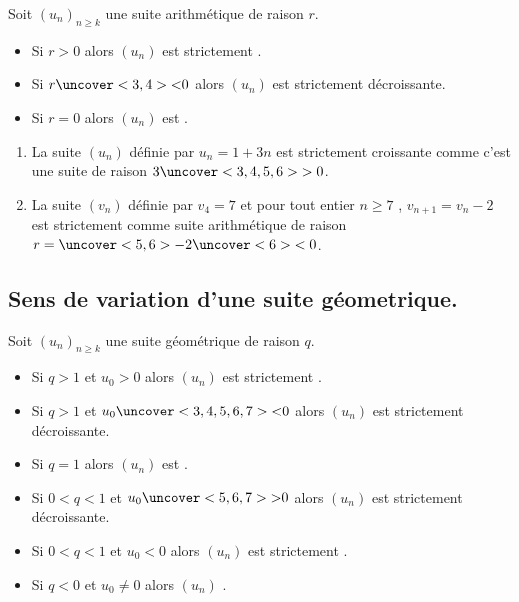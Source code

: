 \documentclass{beamer}
\begin{document}
 \begin{frame}
 \begin{theorem}
  Soit $(u_n)_{n \geq k}$ une suite arithmétique de raison $r$.
  \begin{itemize}
   \item Si $r >0$ alors $(u_n)$ est strictement .
   \item Si $r \uncover<3,4>{<} 0$ alors $(u_n)$ est strictement décroissante.
   \item Si $r=0$ alors $(u_n)$ est .
  \end{itemize}
 \end{theorem}
 \end{frame}
 
 \begin{frame}
 \begin{example}
    
    \begin{enumerate}
     \item La suite $(u_n)$ définie par $u_n=1+3n$ est strictement croissante comme 
     c'est une suite  de raison $3\uncover<3,4,5,6>{>0}$.
     \item La suite $(v_n)$ définie par $v_4=7$ et pour tout entier $n \geq 7$
     , $v_{n+1}=v_n -2$ est strictement  comme suite arithmétique
     de raison $r=\uncover<5,6>{-2}\uncover<6>{<0}$.
    \end{enumerate}
 \end{example}
 \end{frame}
 
    \subsection{Sens de variation d'une suite géometrique.}

 \begin{frame}
 \begin{theorem}
  Soit $(u_n)_{n \geq k}$ une suite géométrique de raison $q$.
  \begin{itemize}
   \item Si $q > 1$ et $u_0>0$ alors $(u_n)$ est strictement .
   \item Si $q > 1$ et $u_0\uncover<3,4,5,6,7>{<}0$ alors $(u_n)$ est strictement décroissante.
   \item Si $q = 1$ alors $(u_n)$ est .
   \item Si $0 < q < 1$ et $u_0\uncover<5,6,7>{>}0$ alors $(u_n)$ est strictement décroissante.
   \item Si $0 < q < 1$ et $u_0<0$ alors $(u_n)$ est strictement .
   \item Si $q < 0$ et $u_0 \neq 0$ alors $(u_n)$ .
  \end{itemize}
 \end{theorem}
 \end{frame}
 
\end{document}
